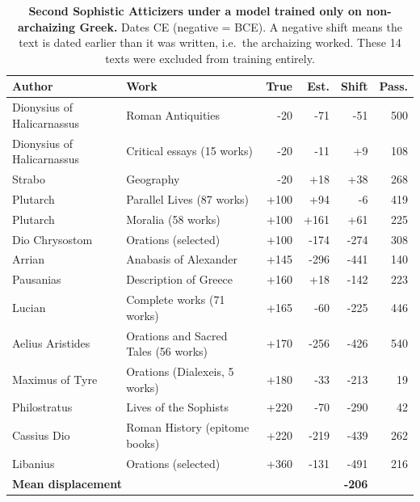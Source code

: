 \begin{table}[!ht]
\centering
\footnotesize
\caption{\textbf{Second Sophistic Atticizers under a model trained only on non-archaizing Greek.}  Dates CE (negative = BCE).  A negative shift means the text is dated earlier than it was written, i.e.\ the archaizing worked.  These 14 texts were excluded from training entirely.}
\label{tab:greek}
\begin{tabular}{llrrrr}
\toprule
\textbf{Author} & \textbf{Work} & \textbf{True} & \textbf{Est.} & \textbf{Shift} & \textbf{Pass.} \\
\midrule
Dionysius of Halicarnassus & Roman Antiquities & -20 & -71 & -51 & 500 \\
Dionysius of Halicarnassus & Critical essays (15 works) & -20 & -11 & +9 & 108 \\
Strabo & Geography & -20 & +18 & +38 & 268 \\
Plutarch & Parallel Lives (87 works) & +100 & +94 & -6 & 419 \\
Plutarch & Moralia (58 works) & +100 & +161 & +61 & 225 \\
Dio Chrysostom & Orations (selected) & +100 & -174 & -274 & 308 \\
Arrian & Anabasis of Alexander & +145 & -296 & -441 & 140 \\
Pausanias & Description of Greece & +160 & +18 & -142 & 223 \\
Lucian & Complete works (71 works) & +165 & -60 & -225 & 446 \\
Aelius Aristides & Orations and Sacred Tales (56 works) & +170 & -256 & -426 & 540 \\
Maximus of Tyre & Orations (Dialexeis, 5 works) & +180 & -33 & -213 & 19 \\
Philostratus & Lives of the Sophists & +220 & -70 & -290 & 42 \\
Cassius Dio & Roman History (epitome books) & +220 & -219 & -439 & 262 \\
Libanius & Orations (selected) & +360 & -131 & -491 & 216 \\
\midrule
\multicolumn{4}{l}{\textbf{Mean displacement}} & \textbf{-206} & \\
\bottomrule
\end{tabular}
\end{table}

